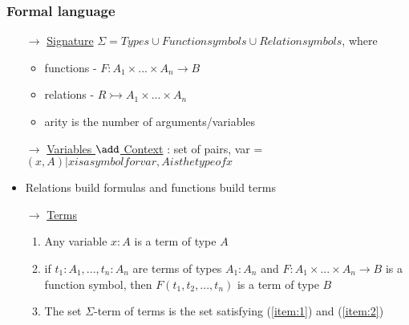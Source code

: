 \documentclass{article}
\begin{document}
\subsubsection{Formal language}
\begin{itemize}
  \item[$\rightarrow$] \underline{Signature} $\Sigma = {Types} \cup {Function symbols} \cup {Relation symbols}$, where
  \begin{itemize}
    \item functions - $F:A_1 \times ... \times A_n \rightarrow B$
    \item relations - $R \rightarrowtail A_1 \times ... \times A_n$
    \item arity is the number of arguments/variables
  \end{itemize}
  \item[$\rightarrow$] \underline{Variables $\add$ Context} : set of pairs, var = ${(x,A) \vert x is a symbol for var, A is the type of x}$
  \item Relations build formulas and functions build terms
  
  \item[$\rightarrow$] \underline{Terms}
  \begingroup
    \renewcommand\labelenumi{(\theenumi)}
    \begin{enumerate}
      \item Any variable $x:A$ is a term of type $A$ \label{item:1}
      \item if $t_1:A_1, ..., t_n:A_n$ are terms of types $A_1:A_n$ and  $F:A_1 \times ... \times A_n \rightarrow B$ is a function symbol, then $F(t_1, t_2, ..., t_n)$ is a term of type $B$ \label{item:2}
      \item The set $\Sigma$-term of terms is the set satisfying (\ref{item:1}) and (\ref{item:2})
    \end{enumerate}
  \endgroup


\end{itemize}
\end{document}
